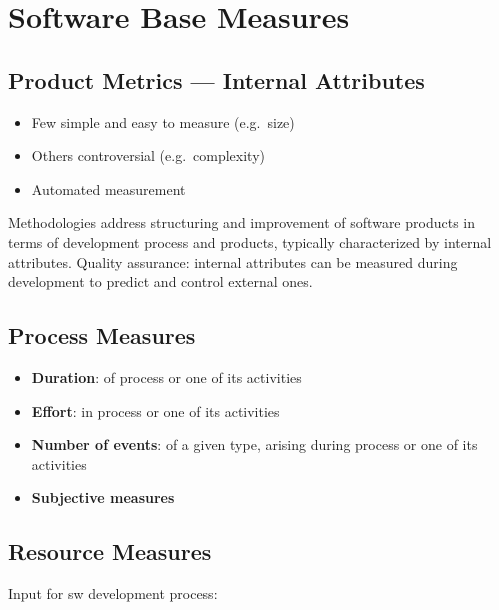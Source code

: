 \section{Software Base Measures}

\subsection{Product Metrics — Internal Attributes}

\begin{itemize}
  \item Few simple and easy to measure (e.g.\ size)
  \item Others controversial (e.g.\ complexity)
  \item Automated measurement
\end{itemize}

Methodologies address structuring and improvement of software products in terms of
development process and products, typically characterized by internal attributes.
Quality assurance: internal attributes can be measured during development to predict
and control external ones.

\subsection{Process Measures}

\begin{itemize}
  \item \textbf{Duration}: of process or one of its activities
  \item \textbf{Effort}: in process or one of its activities
  \item \textbf{Number of events}: of a given type, arising during process or one of
        its activities
  \item \textbf{Subjective measures}
\end{itemize}

\subsection{Resource Measures}

Input for sw development process:

